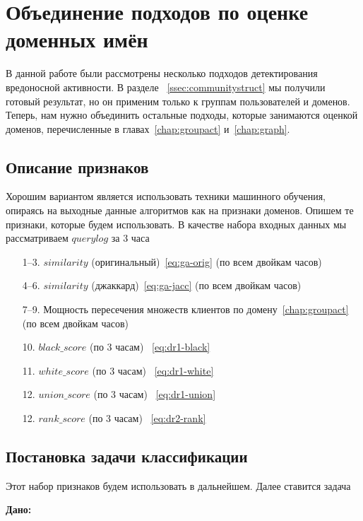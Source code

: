 \documentclass[14pt]{extreport} %
\begin{document}
\chapter{Объединение подходов по оценке доменных имён}
\label{chap:union-all}
В данной работе были рассмотрены несколько подходов детектирования вредоносной активности. В разделе ~\ref{ssec:communitystruct} мы получили готовый результат, но он применим только к группам пользователей и доменов. Теперь, нам нужно объединить остальные подходы, которые занимаются оценкой доменов, перечисленные в главах~\ref{chap:groupact} и~\ref{chap:graph}.
	
\section{Описание признаков}
\label{sec:desc-features}
Хорошим вариантом является использовать техники машинного обучения, опираясь на выходные данные алгоритмов как на признаки доменов. Опишем те признаки, которые будем использовать. В качестве набора входных данных мы рассматриваем $querylog$ за 3 часа
\begin{enumerate}
	\item [1--3.] $similarity$ (оригинальный)~\eqref{eq:ga-orig}  (по всем двойкам часов)
	\item [4--6.]$similarity$ (джаккард)~\eqref{eq:ga-jacc} (по всем двойкам часов)
	\item [7--9.] Мощность пересечения множеств клиентов по домену~\eqref{chap:groupact} (по всем двойкам часов)
	\item [10.] $black\_score$ (по 3 часам) ~\eqref{eq:dr1-black}
	\item [11.] $white\_score$ (по 3 часам) ~\eqref{eq:dr1-white}
	\item [12.] $union\_score$ (по 3 часам) ~\eqref{eq:dr1-union}
	\item [12.] $rank\_score$ (по 3 часам) ~\eqref{eq:dr2-rank}
	      	      		
\end{enumerate}
\section{Постановка задачи классификации}
Этот набор признаков будем использовать в дальнейшем. Далее ставится задача
	
{\bf
	Дано:
}
\end{document}
